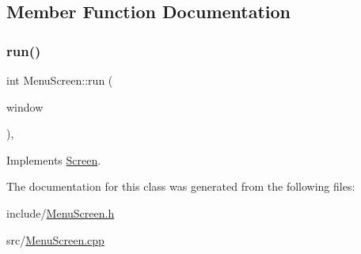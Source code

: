 \subsection{Member Function Documentation}
\mbox{\label{class_menu_screen_ad6e00debf1d2ddcaa716327598590cf5}} 
\subsubsection{\texorpdfstring{run()}{run()}}
{\footnotesize\ttfamily int Menu\+Screen\+::run (\begin{DoxyParamCaption}\item[{sf\+::\+Render\+Window \&}]{window }\end{DoxyParamCaption})\hspace{0.3cm}{\ttfamily [override]}, {\ttfamily [virtual]}}



Implements \hyperlink{class_screen_aac0f7f072481e517dafc85ad292d6f00}{Screen}.



The documentation for this class was generated from the following files\+:\begin{DoxyCompactItemize}
\item 
include/\hyperlink{_menu_screen_8h}{Menu\+Screen.\+h}\item 
src/\hyperlink{_menu_screen_8cpp}{Menu\+Screen.\+cpp}\end{DoxyCompactItemize}
